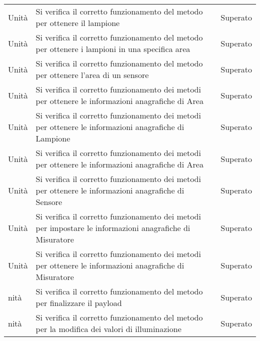\begin{center}
\begin{xltabular}{\linewidth}{|l|X|l|}
        Unità & Si verifica il corretto funzionamento del metodo per ottenere il lampione & Superato\\
        Unità & Si verifica il corretto funzionamento del metodo per ottenere i lampioni in una specifica area & Superato\\
        Unità & Si verifica il corretto funzionamento del metodo per ottenere l'area di un sensore & Superato\\
        Unità & Si verifica il corretto funzionamento dei metodi per ottenere le informazioni anagrafiche di Area & Superato\\
        Unità & Si verifica il corretto funzionamento dei metodi per ottenere le informazioni anagrafiche di Lampione & Superato\\
        Unità & Si verifica il corretto funzionamento dei metodi per ottenere le informazioni anagrafiche di Area & Superato\\
        Unità & Si verifica il corretto funzionamento dei metodi per ottenere le informazioni anagrafiche di Sensore & Superato\\
        Unità & Si verifica il corretto funzionamento dei metodi per impostare le informazioni anagrafiche di Misuratore & Superato\\
        Unità & Si verifica il corretto funzionamento dei metodi per ottenere le informazioni anagrafiche di Misuratore & Superato\\
        nità & Si verifica il corretto funzionamento del metodo per finalizzare il payload & Superato\\
        nità & Si verifica il corretto funzionamento del metodo per la modifica dei valori di illuminazione & Superato\\


\end{xltabular}
\end{center}
